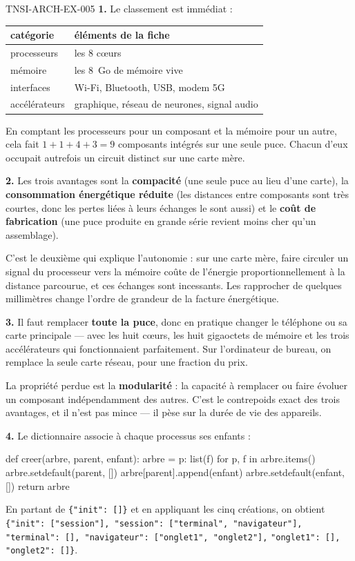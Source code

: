 \begin{corrige}{TNSI-ARCH-EX-005}
\textbf{1.} Le classement est immédiat :

\begin{center}
\begin{tabular}{ll}
\hline
catégorie & éléments de la fiche \\
\hline
processeurs & les $8$ c\oe{}urs \\
mémoire & les $8$~Go de mémoire vive \\
interfaces & Wi-Fi, Bluetooth, USB, modem 5G \\
accélérateurs & graphique, réseau de neurones, signal audio \\
\hline
\end{tabular}
\end{center}

En comptant les processeurs pour un composant et la mémoire pour un autre, cela
fait $1+1+4+3=9$ composants intégrés sur une seule puce. Chacun d'eux occupait
autrefois un circuit distinct sur une carte mère.

\textbf{2.} Les trois avantages sont la \textbf{compacité} (une seule puce au
lieu d'une carte), la \textbf{consommation énergétique réduite} (les distances
entre composants sont très courtes, donc les pertes liées à leurs échanges le
sont aussi) et le \textbf{coût de fabrication} (une puce produite en grande série
revient moins cher qu'un assemblage).

C'est le deuxième qui explique l'autonomie : sur une carte mère, faire circuler
un signal du processeur vers la mémoire coûte de l'énergie proportionnellement à
la distance parcourue, et ces échanges sont incessants. Les rapprocher de
quelques millimètres change l'ordre de grandeur de la facture énergétique.

\textbf{3.} Il faut remplacer \textbf{toute la puce}, donc en pratique changer
le téléphone ou sa carte principale — avec les huit c\oe{}urs, les huit gigaoctets
de mémoire et les trois accélérateurs qui fonctionnaient parfaitement. Sur
l'ordinateur de bureau, on remplace la seule carte réseau, pour une fraction du
prix.

La propriété perdue est la \textbf{modularité} : la capacité à remplacer ou faire
évoluer un composant indépendamment des autres. C'est le contrepoids exact des
trois avantages, et il n'est pas mince — il pèse sur la durée de vie des
appareils.

\textbf{4.} Le dictionnaire associe à chaque processus ses enfants :
\begin{python}
def creer(arbre, parent, enfant):
    arbre = {p: list(f) for p, f in arbre.items()}
    arbre.setdefault(parent, [])
    arbre[parent].append(enfant)
    arbre.setdefault(enfant, [])
    return arbre
\end{python}
En partant de \lstinline!{"init": []}! et en appliquant les cinq créations, on
obtient
\lstinline!{"init": ["session"], "session": ["terminal", "navigateur"],!
\lstinline!"terminal": [], "navigateur": ["onglet1", "onglet2"],!
\lstinline!"onglet1": [], "onglet2": []}!.


\end{corrige}
